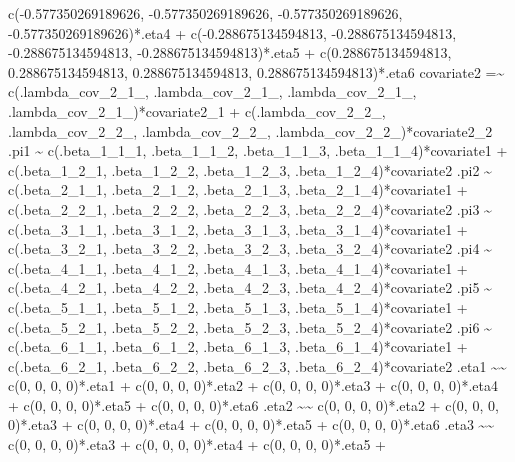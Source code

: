 \documentclass[
]{book}
\newenvironment{Shaded}{\begin{snugshade}}{\end{snugshade}}
\newcommand{\StringTok}[1]{\textcolor[rgb]{0.31,0.60,0.02}{#1}}
\begin{document}
\begin{Shaded}
\begin{Highlighting}[]
\StringTok{    c({-}0.577350269189626, {-}0.577350269189626, {-}0.577350269189626, {-}0.577350269189626)*.eta4 +}
\StringTok{    c({-}0.288675134594813, {-}0.288675134594813, {-}0.288675134594813, {-}0.288675134594813)*.eta5 +}
\StringTok{    c(0.288675134594813, 0.288675134594813, 0.288675134594813, 0.288675134594813)*.eta6}
\StringTok{covariate2 =\textasciitilde{}}
\StringTok{    c(.lambda\_cov\_2\_1\_, .lambda\_cov\_2\_1\_, .lambda\_cov\_2\_1\_, .lambda\_cov\_2\_1\_)*covariate2\_1 +}
\StringTok{    c(.lambda\_cov\_2\_2\_, .lambda\_cov\_2\_2\_, .lambda\_cov\_2\_2\_, .lambda\_cov\_2\_2\_)*covariate2\_2}
\StringTok{.pi1 \textasciitilde{}}
\StringTok{    c(.beta\_1\_1\_1, .beta\_1\_1\_2, .beta\_1\_1\_3, .beta\_1\_1\_4)*covariate1 +}
\StringTok{    c(.beta\_1\_2\_1, .beta\_1\_2\_2, .beta\_1\_2\_3, .beta\_1\_2\_4)*covariate2}
\StringTok{.pi2 \textasciitilde{}}
\StringTok{    c(.beta\_2\_1\_1, .beta\_2\_1\_2, .beta\_2\_1\_3, .beta\_2\_1\_4)*covariate1 +}
\StringTok{    c(.beta\_2\_2\_1, .beta\_2\_2\_2, .beta\_2\_2\_3, .beta\_2\_2\_4)*covariate2}
\StringTok{.pi3 \textasciitilde{}}
\StringTok{    c(.beta\_3\_1\_1, .beta\_3\_1\_2, .beta\_3\_1\_3, .beta\_3\_1\_4)*covariate1 +}
\StringTok{    c(.beta\_3\_2\_1, .beta\_3\_2\_2, .beta\_3\_2\_3, .beta\_3\_2\_4)*covariate2}
\StringTok{.pi4 \textasciitilde{}}
\StringTok{    c(.beta\_4\_1\_1, .beta\_4\_1\_2, .beta\_4\_1\_3, .beta\_4\_1\_4)*covariate1 +}
\StringTok{    c(.beta\_4\_2\_1, .beta\_4\_2\_2, .beta\_4\_2\_3, .beta\_4\_2\_4)*covariate2}
\StringTok{.pi5 \textasciitilde{}}
\StringTok{    c(.beta\_5\_1\_1, .beta\_5\_1\_2, .beta\_5\_1\_3, .beta\_5\_1\_4)*covariate1 +}
\StringTok{    c(.beta\_5\_2\_1, .beta\_5\_2\_2, .beta\_5\_2\_3, .beta\_5\_2\_4)*covariate2}
\StringTok{.pi6 \textasciitilde{}}
\StringTok{    c(.beta\_6\_1\_1, .beta\_6\_1\_2, .beta\_6\_1\_3, .beta\_6\_1\_4)*covariate1 +}
\StringTok{    c(.beta\_6\_2\_1, .beta\_6\_2\_2, .beta\_6\_2\_3, .beta\_6\_2\_4)*covariate2}
\StringTok{.eta1 \textasciitilde{}\textasciitilde{}}
\StringTok{    c(0, 0, 0, 0)*.eta1 +}
\StringTok{    c(0, 0, 0, 0)*.eta2 +}
\StringTok{    c(0, 0, 0, 0)*.eta3 +}
\StringTok{    c(0, 0, 0, 0)*.eta4 +}
\StringTok{    c(0, 0, 0, 0)*.eta5 +}
\StringTok{    c(0, 0, 0, 0)*.eta6}
\StringTok{.eta2 \textasciitilde{}\textasciitilde{}}
\StringTok{    c(0, 0, 0, 0)*.eta2 +}
\StringTok{    c(0, 0, 0, 0)*.eta3 +}
\StringTok{    c(0, 0, 0, 0)*.eta4 +}
\StringTok{    c(0, 0, 0, 0)*.eta5 +}
\StringTok{    c(0, 0, 0, 0)*.eta6}
\StringTok{.eta3 \textasciitilde{}\textasciitilde{}}
\StringTok{    c(0, 0, 0, 0)*.eta3 +}
\StringTok{    c(0, 0, 0, 0)*.eta4 +}
\StringTok{    c(0, 0, 0, 0)*.eta5 +}

\end{Highlighting}
\end{Shaded}
\end{document}
